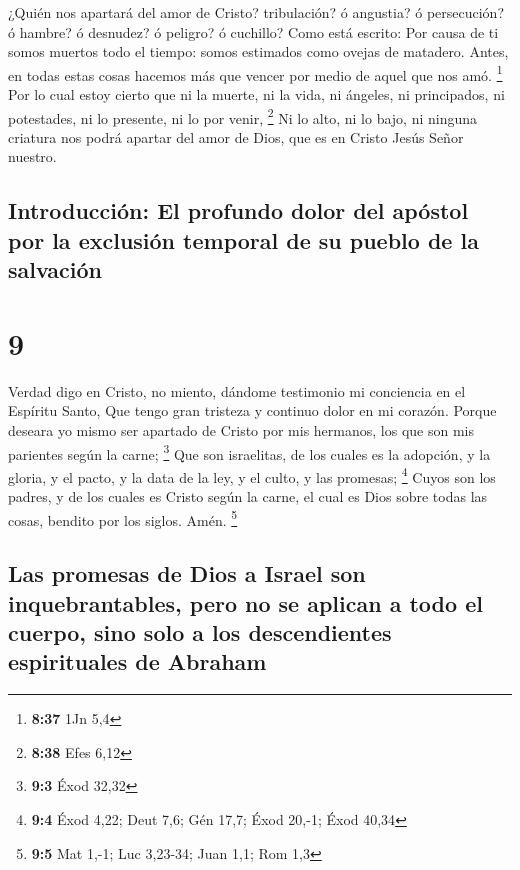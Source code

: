  ¿Quién nos apartará del amor de Cristo? tribulación? ó
angustia? ó persecución? ó hambre? ó desnudez? ó peligro? ó cuchillo?
 Como está escrito: Por causa de ti somos muertos todo el
tiempo: somos estimados como ovejas de matadero.  Antes,
en todas estas cosas hacemos más que vencer por medio de aquel que nos
amó. \footnote{\textbf{8:37} 1Jn 5,4}  Por lo cual estoy
cierto que ni la muerte, ni la vida, ni ángeles, ni principados, ni
potestades, ni lo presente, ni lo por venir, \footnote{\textbf{8:38}
  Efes 6,12}  Ni lo alto, ni lo bajo, ni ninguna criatura
nos podrá apartar del amor de Dios, que es en Cristo Jesús Señor
nuestro.

\hypertarget{introducciuxf3n-el-profundo-dolor-del-apuxf3stol-por-la-exclusiuxf3n-temporal-de-su-pueblo-de-la-salvaciuxf3n}{%
\subsection{Introducción: El profundo dolor del apóstol por la exclusión
temporal de su pueblo de la
salvación}\label{introducciuxf3n-el-profundo-dolor-del-apuxf3stol-por-la-exclusiuxf3n-temporal-de-su-pueblo-de-la-salvaciuxf3n}}

\hypertarget{section-8}{%
\section{9}\label{section-8}}

 Verdad digo en Cristo, no miento, dándome testimonio mi
conciencia en el Espíritu Santo,  Que tengo gran tristeza
y continuo dolor en mi corazón.  Porque deseara yo mismo
ser apartado de Cristo por mis hermanos, los que son mis parientes según
la carne; \footnote{\textbf{9:3} Éxod 32,32}  Que son
israelitas, de los cuales es la adopción, y la gloria, y el pacto, y la
data de la ley, y el culto, y las promesas; \footnote{\textbf{9:4} Éxod
  4,22; Deut 7,6; Gén 17,7; Éxod 20,-1; Éxod 40,34}  Cuyos
son los padres, y de los cuales es Cristo según la carne, el cual es
Dios sobre todas las cosas, bendito por los siglos. Amén. \footnote{\textbf{9:5}
  Mat 1,-1; Luc 3,23-34; Juan 1,1; Rom 1,3}

\hypertarget{las-promesas-de-dios-a-israel-son-inquebrantables-pero-no-se-aplican-a-todo-el-cuerpo-sino-solo-a-los-descendientes-espirituales-de-abraham}{%
\subsection{Las promesas de Dios a Israel son inquebrantables, pero no
se aplican a todo el cuerpo, sino solo a los descendientes espirituales
de
Abraham}\label{las-promesas-de-dios-a-israel-son-inquebrantables-pero-no-se-aplican-a-todo-el-cuerpo-sino-solo-a-los-descendientes-espirituales-de-abraham}}

